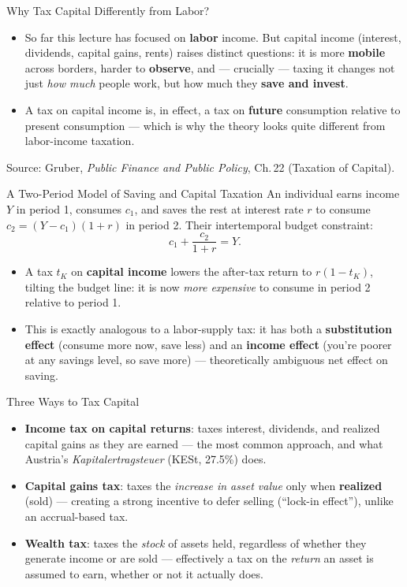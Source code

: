 \documentclass[11pt,aspectratio=169]{beamer}
\newcommand{\srcnote}[1]{{\footnotesize\color{wugray}Source: #1}}
\begin{document}
\begin{frame}{Why Tax Capital Differently from Labor?}
  \small
  \begin{itemize}
    \item So far this lecture has focused on \textbf{labor} income. But capital income (interest, dividends, capital gains, rents) raises distinct questions: it is more \textbf{mobile} across borders, harder to \textbf{observe}, and --- crucially --- taxing it changes not just \emph{how much} people work, but how much they \textbf{save and invest}.
    \item A tax on capital income is, in effect, a tax on \textbf{future} consumption relative to present consumption --- which is why the theory looks quite different from labor-income taxation.
  \end{itemize}
  \srcnote{Gruber, \emph{Public Finance and Public Policy}, Ch.\,22 (Taxation of Capital).}
\end{frame}

\begin{frame}{A Two-Period Model of Saving and Capital Taxation}
  \footnotesize
  An individual earns income $Y$ in period 1, consumes $c_1$, and saves the rest at interest rate $r$ to consume $c_2 = (Y-c_1)(1+r)$ in period 2. Their intertemporal budget constraint:
  \[
    c_1 + \frac{c_2}{1+r} = Y.
  \]
  \vspace{0.3em}
  \begin{itemize}
    \item A tax $t_K$ on \textbf{capital income} lowers the after-tax return to $r(1-t_K)$, tilting the budget line: it is now \emph{more expensive} to consume in period 2 relative to period 1.
    \item This is exactly analogous to a labor-supply tax: it has both a \textbf{substitution effect} (consume more now, save less) and an \textbf{income effect} (you're poorer at any savings level, so save more) --- theoretically ambiguous net effect on saving.
  \end{itemize}
\end{frame}

\begin{frame}{Three Ways to Tax Capital}
  \small
  \begin{itemize}
    \item \textbf{Income tax on capital returns}: taxes interest, dividends, and realized capital gains as they are earned --- the most common approach, and what Austria's \emph{Kapitalertragsteuer} (KESt, 27.5\%) does.
    \item \textbf{Capital gains tax}: taxes the \emph{increase in asset value} only when \textbf{realized} (sold) --- creating a strong incentive to defer selling (``lock-in effect''), unlike an accrual-based tax.
    \item \textbf{Wealth tax}: taxes the \emph{stock} of assets held, regardless of whether they generate income or are sold --- effectively a tax on the \emph{return} an asset is assumed to earn, whether or not it actually does.
  \end{itemize}
\end{frame}
\end{document}
